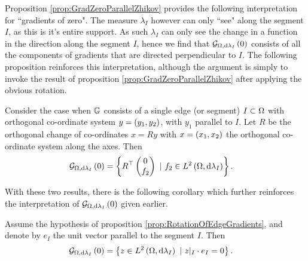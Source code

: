 Proposition \ref{prop:GradZeroParallelZhikov} provides the following interpretation for ``gradients of zero".
The measure $\lambda_I$ however can only ``see" along the segment $I$, as this is it's entire support.
As such $\lambda_I$ can only see the change in a function in the direction along the segment $I$, hence we find that $\mathcal{G}_{ \Omega, \mathrm{d}\lambda_I}\left( 0 \right)$ consists of all the components of gradients that are directed perpendicular to $I$.
The following proposition reinforces this interpretation, although the argument is simply to invoke the result of proposition \ref{prop:GradZeroParallelZhikov} after applying the obvious rotation.
\begin{prop} \label{prop:RotationOfEdgeGradients}
	Consider the case when $\mathbb{G}$ consists of a single edge (or segment) $I\subset\Omega$ with orthogonal co-ordinate system $y=\left( y_1,y_2 \right)$, with $y_1$ parallel to $I$.
	Let $R$ be the orthogonal change of co-ordinates $x=Ry$ with $x=\left( x_1,x_2 \right)$ the orthogonal co-ordinate system along the axes.
	Then
	\begin{align*}
		\mathcal{G}_{ \Omega, \mathrm{d}\lambda_I}\left( 0 \right) 
		&= \left\{  R^{\top} \begin{pmatrix} 0 \\ f_2 \end{pmatrix} \ \vert \ f_2\in L^{2}\left( \Omega,\mathrm{d}\lambda_I \right)  \right\}.
	\end{align*}
\end{prop}
With these two results, there is the following corollary which further reinforces the interpretation of $\mathcal{G}_{ \Omega, \mathrm{d}\lambda_I}\left( 0 \right)$ given earlier.
\begin{cory} \label{cory:Grad0SingleEdge}
	Assume the hypothesis of proposition \ref{prop:RotationOfEdgeGradients}, and denote by $e_I$ the unit vector parallel to the segment $I$.
	Then
	\begin{align*}
		\mathcal{G}_{ \Omega, \mathrm{d}\lambda_I}\left( 0 \right) &= \left\{ z\in L^{2}\left( \Omega,\mathrm{d}\lambda_I \right) \ \vert \ z\vert_{I}\cdot e_I = 0 \right\}.
	\end{align*}
\end{cory}

